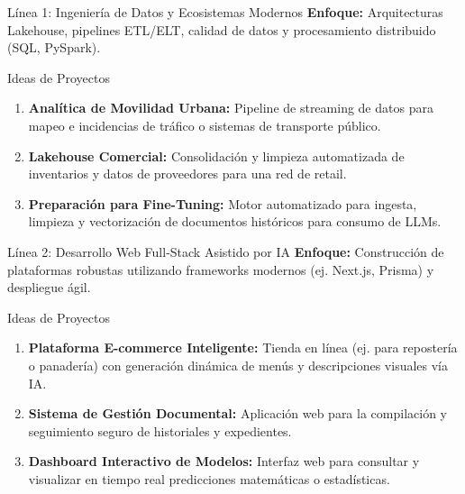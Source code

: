 \documentclass[aspectratio=169]{beamer}
\begin{document}
\begin{frame}{Línea 1: Ingeniería de Datos y Ecosistemas Modernos}
    \textbf{Enfoque:} Arquitecturas Lakehouse, pipelines ETL/ELT, calidad de datos y procesamiento distribuido (SQL, PySpark).
    
    \vspace{0.3cm}
    \begin{exampleblock}{Ideas de Proyectos}
        \begin{enumerate}
            \item \textbf{Analítica de Movilidad Urbana:} Pipeline de streaming de datos para mapeo e incidencias de tráfico o sistemas de transporte público.
            \item \textbf{Lakehouse Comercial:} Consolidación y limpieza automatizada de inventarios y datos de proveedores para una red de retail.
            \item \textbf{Preparación para Fine-Tuning:} Motor automatizado para ingesta, limpieza y vectorización de documentos históricos para consumo de LLMs.
        \end{enumerate}
    \end{exampleblock}
\end{frame}

\begin{frame}{Línea 2: Desarrollo Web Full-Stack Asistido por IA}
    \textbf{Enfoque:} Construcción de plataformas robustas utilizando frameworks modernos (ej. Next.js, Prisma) y despliegue ágil.
    
    \vspace{0.3cm}
    \begin{exampleblock}{Ideas de Proyectos}
        \begin{enumerate}
            \item \textbf{Plataforma E-commerce Inteligente:} Tienda en línea (ej. para repostería o panadería) con generación dinámica de menús y descripciones visuales vía IA.
            \item \textbf{Sistema de Gestión Documental:} Aplicación web para la compilación y seguimiento seguro de historiales y expedientes.
            \item \textbf{Dashboard Interactivo de Modelos:} Interfaz web para consultar y visualizar en tiempo real predicciones matemáticas o estadísticas.
        \end{enumerate}
    \end{exampleblock}
\end{frame}
\end{document}
